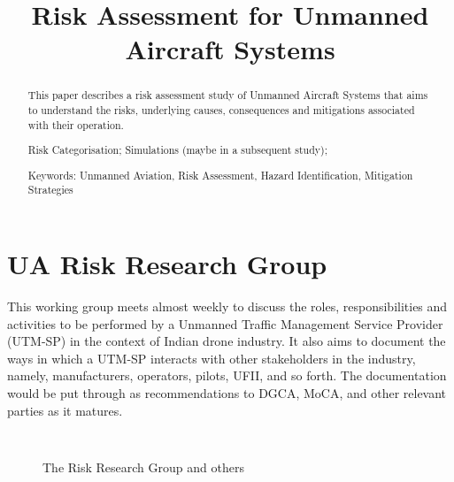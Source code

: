 \documentclass{ua_wgs_base}
\begin{document}
\title{Risk Assessment for Unmanned Aircraft Systems}

\author{\printworkinggroup}

\maketitle
\cleardoublepage{}
\begin{abstract}
This paper describes a risk assessment study of Unmanned Aircraft
Systems that aims to understand the risks, underlying causes, consequences
and mitigations associated with their operation. 

Risk Categorisation; Simulations (maybe in a subsequent study); 

Keywords: Unmanned Aviation, Risk Assessment, Hazard Identification,
Mitigation Strategies
\end{abstract}

\chapter*{UA Risk Research Group\label{sec:wg}}


This working group meets almost weekly to discuss the roles, responsibilities
and activities to be performed by a Unmanned Traffic Management Service
Provider (UTM-SP)
in the context of Indian drone industry. It also aims to document
the ways in which a UTM-SP interacts with other stakeholders in the
industry, namely, manufacturers, operators, pilots, UFII, and so forth.
The documentation would be put through as recommendations to DGCA,
MoCA,
and other relevant parties as it matures.

\begin{figure}[tbh]
\begin{centering}
\begin{center}
\small\tt
\hfil 
{}
\hfil \end{center}
\par\end{centering}
\caption{The Risk Research Group and others}
\end{figure}
\end{document}
